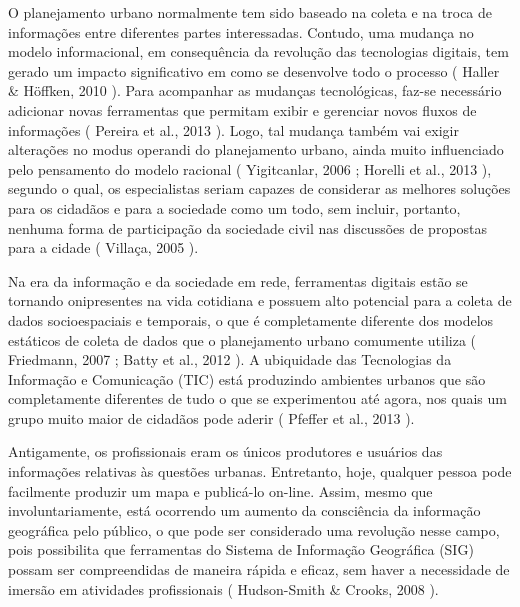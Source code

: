 \documentclass{article}
\begin{document}
O planejamento urbano normalmente tem sido baseado na coleta e na troca de
				informações entre diferentes partes interessadas. Contudo, uma mudança no modelo
				informacional, em consequência da revolução das tecnologias digitais, tem gerado um
				impacto significativo em como se desenvolve todo o processo (%
Haller \& Höffken, 2010%
). Para acompanhar as mudanças
				tecnológicas, faz-se necessário adicionar novas ferramentas que permitam exibir e
				gerenciar novos fluxos de informações (%
Pereira et
					al., 2013%
). Logo, tal mudança também vai exigir alterações no
modus operandi%
 do planejamento urbano, ainda muito influenciado
				pelo pensamento do modelo racional (%
Yigitcanlar,
					2006%
; %
Horelli et al., 2013%
),
				segundo o qual, os especialistas seriam capazes de considerar as melhores soluções
				para os cidadãos e para a sociedade como um todo, sem incluir, portanto, nenhuma
				forma de participação da sociedade civil nas discussões de propostas para a cidade
					(%
Villaça, 2005%
).

Na era da informação e da sociedade em rede, ferramentas digitais estão se tornando
				onipresentes na vida cotidiana e possuem alto potencial para a coleta de dados
				socioespaciais e temporais, o que é completamente diferente dos modelos estáticos de
				coleta de dados que o planejamento urbano comumente utiliza (%
Friedmann, 2007%
; %
Batty et
					al., 2012%
). A ubiquidade das Tecnologias da Informação e Comunicação
				(TIC) está produzindo ambientes urbanos que são completamente diferentes de tudo o
				que se experimentou até agora, nos quais um grupo muito maior de cidadãos pode
				aderir (%
Pfeffer et al., 2013%
).

Antigamente, os profissionais eram os únicos produtores e usuários das informações
				relativas às questões urbanas. Entretanto, hoje, qualquer pessoa pode facilmente
				produzir um mapa e publicá-lo on-line. Assim, mesmo que involuntariamente, está
				ocorrendo um aumento da consciência da informação geográfica pelo público, o que
				pode ser considerado uma revolução nesse campo, pois possibilita que ferramentas do
				Sistema de Informação Geográfica (SIG) possam ser compreendidas de maneira rápida e
				eficaz, sem haver a necessidade de imersão em atividades profissionais (%
Hudson-Smith \& Crooks, 2008%
).
\end{document}
